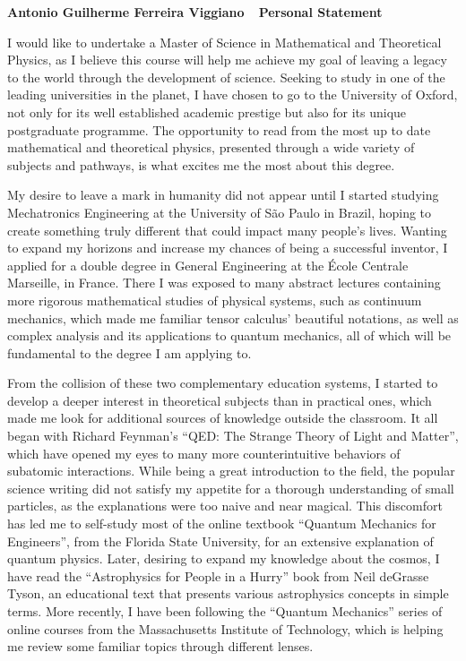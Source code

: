 \documentclass[10pt]{article}
\def\firstname{Antonio Guilherme }
\def\familyname{Ferreira Viggiano}
\def\subj{Personal Statement}
\def\FileTitle{\firstname\familyname~\textemdash~\subj}
\begin{document}
\sffamily %

{\bfseries \FileTitle}

I would like to undertake a Master of Science in Mathematical and Theoretical Physics, as I believe this course will help me achieve my goal of leaving a legacy to the world through the development of science. Seeking to study in one of the leading universities in the planet, I have chosen to go to the University of Oxford, not only for its well established academic prestige but also for its unique postgraduate programme. The opportunity to read from the most up to date mathematical and theoretical physics, presented through a wide variety of subjects and pathways, is what excites me the most about this degree.

My desire to leave a mark in humanity did not appear until I started studying Mechatronics Engineering at the University of São Paulo in Brazil, hoping to create something truly different that could impact many people's lives. Wanting to expand my horizons and increase my chances of being a successful inventor, I applied for a double degree in General Engineering at the École Centrale Marseille, in France. There I was exposed to many abstract lectures containing more rigorous mathematical studies of physical systems, such as continuum mechanics, which made me familiar tensor calculus' beautiful notations, as well as complex analysis and its applications to quantum mechanics, all of which will be fundamental to the degree I am applying to.

From the collision of these two complementary education systems, I started to develop a deeper interest in theoretical subjects than in practical ones, which made me look for additional sources of knowledge outside the classroom. It all began with Richard Feynman's ``QED: The Strange Theory of Light and Matter'', which have opened my eyes to many more counterintuitive behaviors of subatomic interactions. While being a great introduction to the field, the popular science writing did not satisfy my appetite for a thorough understanding of small particles, as the explanations were too naive and near magical. This discomfort has led me to self-study most of the online textbook ``Quantum Mechanics for Engineers'', from the Florida State University, for an extensive explanation of quantum physics. Later, desiring to expand my knowledge about the cosmos, I have read the ``Astrophysics for People in a Hurry'' book from Neil deGrasse Tyson, an educational text that presents various astrophysics concepts in simple terms. More recently, I have been following the ``Quantum Mechanics'' series of online courses from the Massachusetts Institute of Technology, which is helping me review some familiar topics through different lenses.
\end{document}

